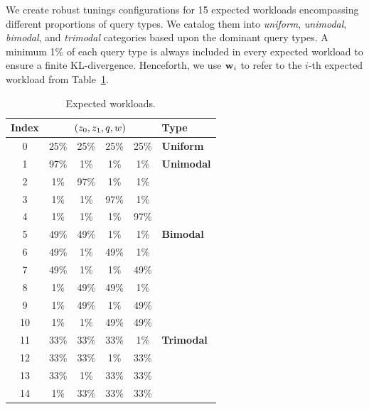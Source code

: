 We create robust tunings configurations for 15 expected workloads encompassing
    different proportions of query types.
We catalog them into \emph{uniform}, \emph{unimodal}, \emph{bimodal}, and
    \emph{trimodal} categories based upon the dominant query types.
A minimum 1\% of each query type is always included in every expected workload
    to ensure a finite KL-divergence.
Henceforth, we use ${{\bf{w}}}_i$ to refer to the $i$-th expected 
    workload from Table~\ref{tab:expected-workloads}.
\begin{table}[h]
    \centering%
    \begin{tabular}{c cccc l}
    \toprule
    Index & \multicolumn{4}{c}{$({{z_0}}, {{z_1}}, {{q}}, {{w}})$} & Type \\
    \toprule
    0 & 25\% & 25\% & 25\% & 25\% & \textbf{Uniform} \\
    \midrule
    1 & 97\% & 1\% & 1\% & 1\% & \textbf{Unimodal}\\
    2 & 1\% & 97\% & 1\% & 1\% & \\
    3 & 1\% & 1\% & 97\% & 1\% & \\
    4 & 1\% & 1\% & 1\% & 97\% & \\
    \midrule
    5 & 49\% & 49\% & 1\% & 1\% & \textbf{Bimodal}\\
    6 & 49\% & 1\% & 49\% & 1\% & \\
    7 & 49\% & 1\% & 1\% & 49\% & \\
    8 & 1\% & 49\% & 49\% & 1\% & \\
    9 & 1\% & 49\% & 1\% & 49\% & \\
    10 & 1\% & 1\% & 49\% & 49\% & \\
    \midrule
    11 & 33\% & 33\% & 33\% & 1\% & \textbf{Trimodal}\\
    12 & 33\% & 33\% & 1\% & 33\% & \\
    13 & 33\% & 1\% & 33\% & 33\% & \\
    14 & 1\% & 33\% & 33\% & 33\% & \\
    \bottomrule
    \end{tabular}
    \caption{Expected workloads.}
    \label{tab:expected-workloads}	
\end{table}

